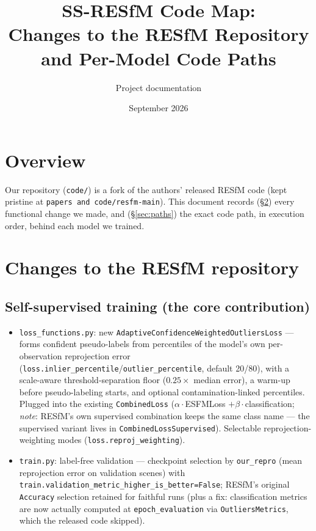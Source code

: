 \documentclass[10pt]{article}
\title{SS-RESfM Code Map:\\Changes to the RESfM Repository and Per-Model Code Paths}
\author{Project documentation}
\date{September 2026}
\newcommand{\code}[1]{\texttt{\small #1}}
\begin{document}
\maketitle

\section{Overview}
Our repository (\code{code/}) is a fork of the authors' released RESfM code (kept
pristine at \code{papers and code/resfm-main}). This document records (\S\ref{sec:changes})
every functional change we made, and (\S\ref{sec:paths}) the exact code path, in execution
order, behind each model we trained.

\section{Changes to the RESfM repository}\label{sec:changes}

\subsection{Self-supervised training (the core contribution)}
\begin{itemize}\itemsep2pt
\item \code{loss\_functions.py}: new
\code{AdaptiveConfidenceWeightedOutliersLoss} --- forms confident pseudo-labels from
percentiles of the model's own per-observation reprojection error
(\code{loss.inlier\_percentile}/\code{outlier\_percentile}, default 20/80), with a
scale-aware threshold-separation floor ($0.25\times$ median error), a warm-up before
pseudo-labeling starts, and optional contamination-linked percentiles. Plugged into the
existing \code{CombinedLoss} ($\alpha\cdot$ESFMLoss $+\beta\cdot$classification;
\emph{note}: RESfM's own supervised combination keeps the same class name --- the
supervised variant lives in \code{CombinedLossSupervised}). Selectable
reprojection-weighting modes (\code{loss.reproj\_weighting}).
\item \code{train.py}: label-free validation --- checkpoint selection by \code{our\_repro}
(mean reprojection error on validation scenes) with
\code{train.validation\_metric\_higher\_is\_better=False}; RESfM's original
\code{Accuracy} selection retained for faithful runs (plus a fix: classification metrics
are now actually computed at \code{epoch\_evaluation} via \code{OutliersMetrics}, which
the released code skipped).
\end{itemize}
\end{document}
